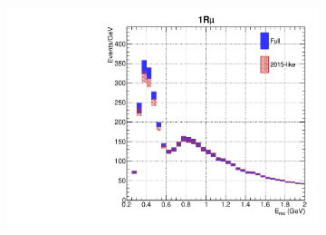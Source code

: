 \begin{figure}[h]
\begin{subfigure}[t]{0.32\textwidth}
	\end{subfigure}
	\begin{subfigure}[t]{0.32\textwidth}
		\includegraphics[width=\textwidth, trim={0mm 0mm 0mm 0mm}, clip, page=3]{figures/mach3/data/alt/try_2017_fit_on_sk_spectra_posterior_sk_error_2015like_spectra}
	\end{subfigure}
		

\end{figure}
